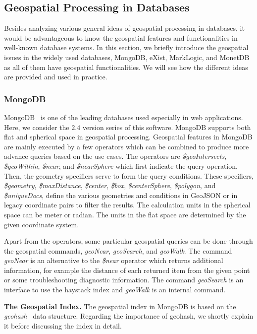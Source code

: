 \documentclass[a4paper,12pt]{article}
\begin{document}
\subsection{Geospatial Processing in Databases} 
\label{s.dbs}
Besides analyzing various general ideas of geospatial processing in databases, it would be advantageous to know the geospatial features and functionalities in well-known database systems. In this section, we briefly introduce the geospatial issues in the widely used databases, MongoDB, eXist, MarkLogic, and MonetDB as all of them have geospatial functionalities. We will see how the different ideas are provided and used in practice.

\subsubsection{MongoDB}
\label{mongo}
MongoDB~\cite{mongogeneral2010,mongoinaction2011} is one of the leading databases used especially in web applications. Here, we consider the $2.4$ version series of this software. MongoDB supports both flat and spherical space in geospatial processing. Geospatial features in MongoDB are mainly executed by a few operators which can be combined to produce more advance queries based on the use cases. 
The operators are \textit{\$geoIntersects}, \textit{\$geoWithin}, \textit{\$near}, and \textit{\$nearSphere} which first indicate the query operation. Then, the geometry specifiers serve to form the query conditions. These specifiers, \textit{\$geometry}, \textit{\$maxDistance}, \textit{\$center}, \textit{\$box}, \textit{\$centerSphere}, \textit{\$polygon}, and \textit{\$uniqueDocs}, define the various geometries and conditions in GeoJSON or in legacy coordinate pairs to filter the results. The calculation units in the spherical space can be meter or radian. The units in the flat space are determined by the given coordinate system. 

Apart from the operators, some particular geospatial queries can be done through the geospatial commands, 
\textit{geoNear}, \textit{geoSearch}, and \textit{geoWalk}. The command \textit{geoNear} is an alternative to the \textit{\$near} operator which returns additional information, for example the distance of each returned item from the given point or some troubleshooting diagnostic information. The command \textit{geoSearch} is an interface to use the haystack index and \textit{geoWalk} is an internal command.

\textbf{The Geospatial Index.}
The geospatial index in MongoDB is based on the \textit{geohash}~\cite{www/geohash} data structure. Regarding the importance of geohash, we shortly explain it before discussing the index in detail.
\end{document}
